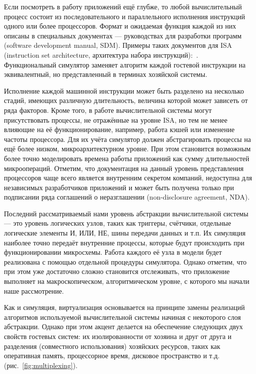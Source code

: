 Если посмотреть в работу приложений ещё глубже, то любой вычислительный процесс состоит из последовательного и параллельного исполнения инструкций одного или более процессоров. Формат и ожидаемая функция каждой из них описаны в специальных документах --- руководствах для разработки программ (\abbr software development manual, SDM). Примеры таких документов для ISA (\abbr instruction set architecture, архитектура набора инструкций):~\cite{intelmanual-7vols, amd-sdm-vol1, weaver1994sparc, arm-sdg, alpha-book}. Функциональный симулятор заменяет алгоритм каждой гостевой инструкции на эквивалентный, но представленный в терминах хозяйской системы.

Исполнение каждой машинной инструкции может быть разделено на несколько стадий, имеющих различную длительность, величина которой может зависеть от ряда факторов. Кроме того, в работе вычислительной системы могут присутствовать процессы, не отражённые на уровне ISA, но тем не менее влияющие на её функционирование, например, работа кэшей или изменение частоты процессора. Для их учёта симулятор должен абстрагировать процессы на ещё более низком, микроархитектурном уровне. При этом становится возможным более точно моделировать времена работы приложений как сумму длительностей микроопераций. Отметим, что документация на данный уровень представления процессоров чаще всего является внутренним секретом компаний, недоступна для независимых разработчиков приложений и может быть получена только при подписании ряда соглашений о неразглашении (\abbr non-disclosure agreement, NDA).

Последний рассматриваемый нами уровень абстракции вычислительной системы --- это уровень логических узлов, таких как триггеры, счётчики, отдельные логические элементы И, ИЛИ, НЕ, шины передачи данных и т.п. Их симуляция наиболее точно передаёт внутренние процессы, которые будут происходить при функционировании микросхемы. Работа каждого её узла в модели будет реализована с помощью отдельной процедуры симулятора. Однако отметим, что при этом уже достаточно сложно становится отслеживать, что приложение выполняет на макроскопическом, алгоритмическом уровне, с которого мы начали наше рассмотрение.

Как и симуляция, виртуализация основывается на принципе замены реализаций алгоритмов используемой вычислительной системы начиная с некоторого слоя абстракции. Однако при этом акцент делается на обеспечение следующих двух свойств гостевых систем: их изолированности от хозяина и друг от друга и разделения (совместного использования) хозяйских ресурсов, таких как оперативная память, процессорное время, дисковое пространство и т.д. (рис.~\ref{fig:multiplexing}).

